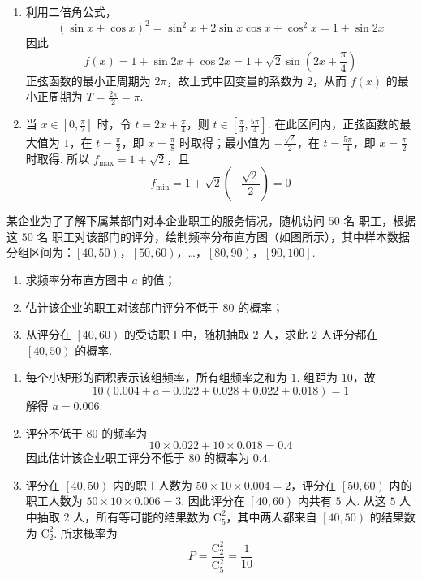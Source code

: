 \begin{solution}
\begin{enumerate}
\item 利用二倍角公式，
\[
(\sin x+\cos x)^2=\sin^2x+2\sin x\cos x+\cos^2x=1+\sin2x
\]
因此
\[
f(x)=1+\sin2x+\cos2x=1+\sqrt2\sin\left(2x+\frac{\pi}{4}\right)
\]
正弦函数的最小正周期为 \(2\pi\)，故上式中因变量的系数为 \(2\)，从而 \(f(x)\) 的最小正周期为 \(T=\frac{2\pi}{2}=\pi\).
\item 当 \(x\in\left[0,\frac\pi2\right]\) 时，令 \(t=2x+\frac\pi4\)，则 \(t\in\left[\frac\pi4,\frac{5\pi}4\right]\). 在此区间内，正弦函数的最大值为 \(1\)，在 \(t=\frac\pi2\)，即 \(x=\frac\pi8\) 时取得；最小值为 \(-\frac{\sqrt2}{2}\)，在 \(t=\frac{5\pi}4\)，即 \(x=\frac\pi2\) 时取得. 所以 \(f_{\max}=1+\sqrt2\)，且
\[
f_{\min}=1+\sqrt2\left(-\frac{\sqrt2}{2}\right)=0
\]
\end{enumerate}
\end{solution}

\begin{problem}
某企业为了了解下属某部门对本企业职工的服务情况，随机访问 \(50\text{ 名}\) 职工，根据这 \(50\text{ 名}\) 职工对该部门的评分，绘制频率分布直方图（如图所示），其中样本数据分组区间为：\(\left[40,50\right)\)，\(\left[50,60\right)\)，…，\(\left[80,90\right)\)，\(\left[90,100\right]\).

\begin{enumerate}
\item 求频率分布直方图中 \(a\) 的值；
\item 估计该企业的职工对该部门评分不低于 \(80\) 的概率；
\item 从评分在 \(\left[40,60\right)\) 的受访职工中，随机抽取 \(2\text{ 人}\)，求此 \(2\) 人评分都在 \(\left[40,50\right)\) 的概率.
\end{enumerate}

\end{problem}

\FloatBarrier

\begin{solution}
\begin{enumerate}
\item 每个小矩形的面积表示该组频率，所有组频率之和为 \(1\). 组距为 \(10\)，故
\[
10\left(0.004+a+0.022+0.028+0.022+0.018\right)=1
\]
解得 \(a=0.006\).
\item 评分不低于 \(80\) 的频率为
\[
10\times0.022+10\times0.018=0.4
\]
因此估计该企业职工评分不低于 \(80\) 的概率为 \(0.4\).
\item 评分在 \(\left[40,50\right)\) 内的职工人数为 \(50\times10\times0.004=2\)，评分在 \(\left[50,60\right)\) 内的职工人数为 \(50\times10\times0.006=3\). 因此评分在 \(\left[40,60\right)\) 内共有 \(5\) 人. 从这 \(5\) 人中抽取 \(2\) 人，所有等可能的结果数为 \(\mathrm C_5^2\)，其中两人都来自 \(\left[40,50\right)\) 的结果数为 \(\mathrm C_2^2\). 所求概率为
\[
P=\frac{\mathrm C_2^2}{\mathrm C_5^2}=\frac{1}{10}
\]
\end{enumerate}
\end{solution}


